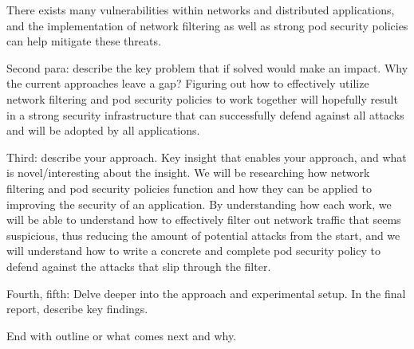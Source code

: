 There exists many vulnerabilities within networks and distributed 
applications, and the implementation of network filtering
as well as strong pod security policies can help mitigate
these threats.

Second para: describe the key problem that if solved would make
an impact. Why the current approaches leave a gap?
Figuring out how to effectively utilize network filtering and
pod security policies to work together will hopefully result
in a strong security infrastructure that can successfully
defend against all attacks and will be adopted by all applications.

Third: describe your approach. Key insight that enables your approach,
and what is novel/interesting about the insight.
We will be researching how network filtering and pod security policies
function and how they can be applied to improving the security of
an application. By understanding how each work, we will be able to
understand how to effectively filter out network traffic that seems
suspicious, thus reducing the amount of potential attacks from the
start, and we will understand how to write a concrete and complete
pod security policy to defend against the attacks that slip through
the filter.

Fourth, fifth: Delve deeper into the approach and experimental setup. 
In the final report, describe key findings.

End with outline or what comes next and why. 
